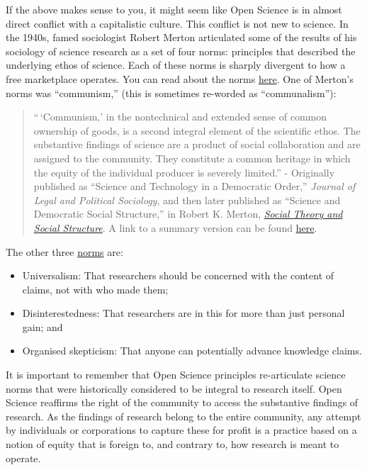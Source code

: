 \documentclass[]{book}
\providecommand{\tightlist}{%
  \setlength{\itemsep}{0pt}\setlength{\parskip}{0pt}}
\begin{document}
If the above makes sense to you, it might seem like Open Science is in almost direct conflict with a capitalistic culture. This conflict is not new to science. In the 1940s, famed sociologist Robert Merton articulated some of the results of his sociology of science research as a set of four norms: principles that described the underlying ethos of science. Each of these norms is sharply divergent to how a free marketplace operates. You can read about the norms \href{https://en.wikipedia.org/wiki/Mertonian_norms}{here}. One of Merton's norms was ``communism,'' (this is sometimes re-worded as ``communalism''):

\begin{quote}
``\,`Communism,' in the nontechnical and extended sense of common ownership of goods, is a second integral element of the scientific ethos. The substantive findings of science are a product of social collaboration and are assigned to the community. They constitute a common heritage in which the equity of the individual producer is severely limited.'' - Originally published as ``Science and Technology in a Democratic Order,'' \emph{Journal of Legal and Political Sociology}, and then later published as ``Science and Democratic Social Structure,'' in Robert K. Merton, \href{https://en.wikipedia.org/wiki/Social_Theory_and_Social_Structure}{\emph{Social Theory and Social Structure}}. A link to a summary version can be found \href{https://www.collier.sts.vt.edu/5424/pdfs/merton_1973.pdf}{here}.
\end{quote}

The other three \href{https://scienceblogs.com/ethicsandscience/2008/01/29/basic-concepts-the-norms-of-sc}{norms} are:

\begin{itemize}
\tightlist
\item
  Universalism: That researchers should be concerned with the content of claims, not with who made them;
\item
  Disinterestedness: That researchers are in this for more than just personal gain; and
\item
  Organised skepticism: That anyone can potentially advance knowledge claims.
\end{itemize}

It is important to remember that Open Science principles re-articulate science norms that were historically considered to be integral to research itself. Open Science reaffirms the right of the community to access the substantive findings of research. As the findings of research belong to the entire community, any attempt by individuals or corporations to capture these for profit is a practice based on a notion of equity that is foreign to, and contrary to, how research is meant to operate.
\end{document}
